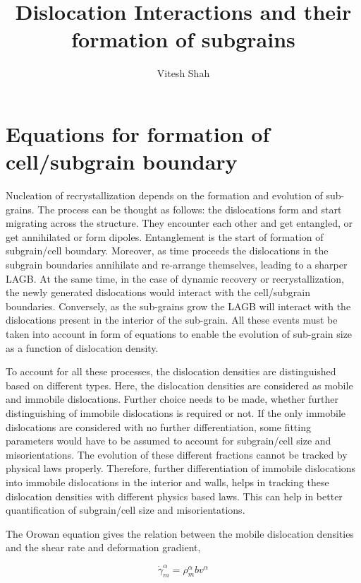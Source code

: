 \documentclass[a4paper,11pt]{article}
\author{Vitesh Shah}
\title{Dislocation Interactions and their formation of subgrains}
\begin{document}
\maketitle
\section{Equations for formation of cell/subgrain boundary} \fussy

\par Nucleation of recrystallization depends on the formation and evolution of sub-grains. The process can be thought as follows: the dislocations form and start migrating across the structure. They encounter each other and get entangled, or get annihilated or form dipoles. Entanglement is the start of formation of subgrain/cell boundary. Moreover, as time proceeds the dislocations in the subgrain boundaries annihilate and re-arrange themselves, leading to a sharper LAGB. At the same time, in the case of dynamic recovery or recrystallization, the newly generated dislocations would interact with the cell/subgrain boundaries. Conversely, as the sub-grains grow the LAGB will interact with the dislocations present in the interior of the sub-grain. All these events must be taken into account in form of equations to enable the evolution of sub-grain size as a function of dislocation density. \par

To account for all these processes, the dislocation densities are distinguished based on different types. 
Here, the dislocation densities are considered as mobile and immobile dislocations. 
Further choice needs to be made, whether further distinguishing of immobile dislocations is required or not. 
If the only immobile dislocations are considered with no further differentiation, some fitting parameters would have to be assumed to account for subgrain/cell size and misorientations. 
The evolution of these different fractions cannot be tracked by physical laws properly. 
Therefore, further differentiation of immobile dislocations into immobile dislocations in the interior and walls, helps in tracking these dislocation densities with different physics based laws. 
This can help in better quantification of subgrain/cell size and misorientations.  

The Orowan equation gives the relation between the mobile dislocation densities and the shear rate and deformation gradient,

\begin{equation} 
\dot{\gamma}_m^\alpha = \rho_m^\alpha b v^\alpha \label{eq:1}
\end{equation}
\end{document}

